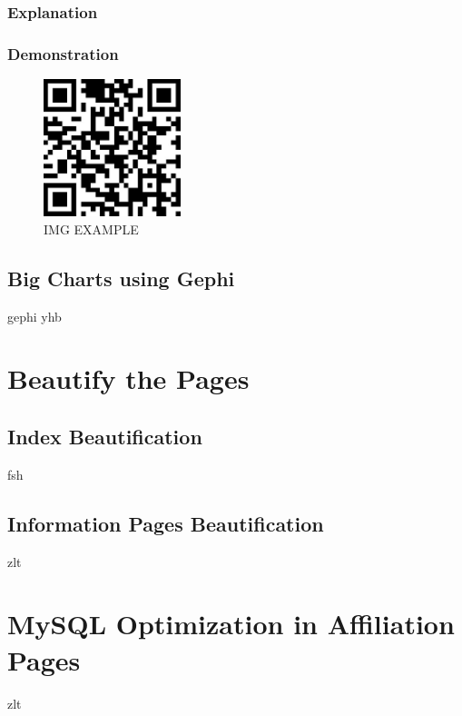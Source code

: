 \documentclass{book}
\begin{document}
\subsection{Explanation}

\subsection{Demonstration}

\begin{figure}[H]
\centering
\includegraphics[height=4.0cm,width=4.0cm]{img/zlt_1.jpg}
\caption{IMG EXAMPLE}
\end{figure}

\section{Big Charts using Gephi}

gephi yhb



\chapter {Beautify the Pages}

\section {Index Beautification}

fsh

\section {Information Pages Beautification}

zlt


\chapter {MySQL Optimization in Affiliation Pages}

zlt
\end{document}
